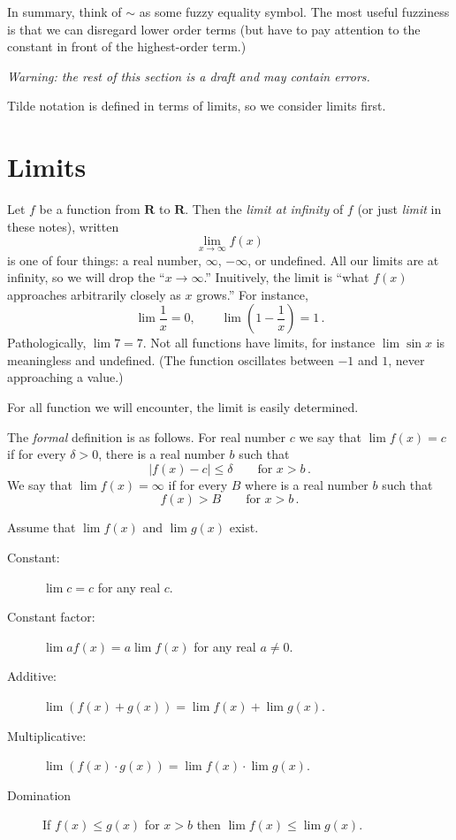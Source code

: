 \documentclass{tstextbook}
\begin{document}
In summary, think of \(\sim\) as some fuzzy equality symbol.
The most useful fuzziness is that we can disregard lower order terms (but have to pay attention to the constant in front of the highest-order term.)



\emph{Warning: the rest of this section is a draft and may contain errors.}

Tilde notation is defined in terms of limits, so we consider limits first.

\section{Limits}

Let $f$ be a function from $\mathbf R$ to $\mathbf R$.
Then the \emph{limit at infinity} of $f$ (or just \emph{limit} in these notes), written
\[ \lim_{x\rightarrow \infty} f(x)\]
is one of four things: a real number, $\infty$, $-\infty$, or undefined.
All our limits are at infinity, so we will drop the ``$x\rightarrow \infty$.''
Inuitively, the limit is ``what $f(x)$ approaches arbitrarily closely as $x$ grows.'' 
For instance,
\[ \lim \frac1x= 0, \qquad \lim\left( 1-\frac1x\right) = 1\,.\]
Pathologically, $\lim 7 =7$.
Not all functions have limits, for instance $\lim \sin x$ is meaningless and undefined.
(The function oscillates between $-1$ and $1$, never approaching a value.)

For all function we will encounter, the limit is easily determined.

The \emph{formal} definition is as follows.
For real number $c$ we say that $\lim f(x) =c$ if for every $\delta > 0$, there is a real number $b$ such that
\[ |f(x) - c|\leq \delta \qquad\text{for $x>b$}\,. \]
We say that $\lim f(x)= \infty$ if for every $B$ where is a real number $b$ such that \[f(x) > B\qquad\text{for $x>b$}\,.\]

\begin{theorem}
  Assume that $\lim f(x)$ and $\lim g(x)$ exist.
  \begin{description}
    \item[Constant:] $\lim c = c$ for any real $c$.
    \item[Constant factor:] $\lim a f(x) = a\lim f(x)$ for any real $a\neq 0$.
    \item[Additive:] $\lim (f(x) + g(x)) = \lim f(x) + \lim g(x)$.
    \item[Multiplicative:] $\lim (f(x) \cdot g(x)) = \lim f(x) \cdot \lim g(x)$.
    \item[Domination] If $f(x) \leq g(x)$  for $x> b$ then $\lim f(x) \leq \lim g(x)$.
  \end{description}
\end{theorem}
\end{document}
